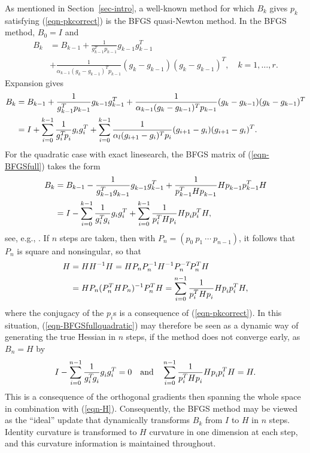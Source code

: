 \documentclass[11pt,twoside]{article}
\begin{document}
As mentioned in Section~\ref{sec-intro}, a well-known method for which
$B_k$ gives $p_k$ satisfying (\ref{eqn-pkcorrect}) is the BFGS
quasi-Newton method. In the BFGS method, $B_0=I$ and
\begin{align}
B_k & = B_{k-1} + \frac1{g_{k-1}^T p_{k-1}}
 g_{k-1}g_{k-1}^T  \nonumber \\
& +
\frac1{\alpha_{k-1}(g_k-g_{k-1})^Tp_{k-1}}(g_{k}-g_{k-1})(g_{k}-g_{k-1})^T,
\quad k=1,\dots,r.
\label{eqn-BFGS}
\end{align}
Expansion gives
\begin{align} \nonumber
B_k & = B_{k-1} + \frac1{g_{k-1}^T p_{k-1}}
 g_{k-1}g_{k-1}^T
 +
\frac1{\alpha_{k-1}(g_k-g_{k-1})^Tp_{k-1}}(g_{k}-g_{k-1})(g_{k}-g_{k-1})^T \\
& = I + \sum_{i=0}^{k-1} \frac1{g_i\T p_i\drop} g_i g_i^T +
\sum_{i=0}^{k-1} \frac1{\alpha_l(g_{i+1}-g_i)^T p_i}
(g_{i+1}-g_{i})(g_{i+1}-g_{i})^T.
\label{eqn-BFGSfull}
\end{align}
For the quadratic case with exact linesearch, the BFGS matrix of
(\ref{eqn-BFGSfull}) takes the form
\begin{align}\nonumber
B_k & = B_{k-1} - \frac1{g_{k-1}^T g_{k-1}\drop} g_{k-1}\drop g_{k-1}^T +
\frac1{p_{k-1}^T H p_{k-1}\drop} H p_{k-1}\drop p_{k-1}^T H \\
& = I - \sum_{i=0}^{k-1} \frac1{g_i\T g_i\drop} g_i g_i^T +
\sum_{i=0}^{k-1} \frac1{p_i^T H p_i\drop} H p_i\drop p_i^T H,
\label{eqn-BFGSfullquadratic}
\end{align}
see, e.g., \cite{EF21}. If $n$ steps are taken, then with $P_n = ( p_0
\ p_1 \ \cdots \ p_{n-1})$, it follows that $P_n$ is square and
nonsingular, so that
\begin{align}
H & = H H\inv H =
H P_n P_n\inv H\inv P_n\Tinv P_n^T H  \nonumber \\
& =
H P_n (P_n^T H P_n)\inv P_n^T H =
\sum_{i=0}^{n-1} \frac1{p_i^T H p_i\drop} H p_i\drop p_i^T H,
\label{eqn-H}
\end{align}
where the conjugacy of the $p_i$s is a consequence of
(\ref{eqn-pkcorrect}). In this situation,
(\ref{eqn-BFGSfullquadratic}) may therefore be seen as a dynamic way
of generating the true Hessian in $n$ steps, if the method does not
converge early, as $B_n=H$ by
\[
I - \sum_{i=0}^{n-1} \frac1{g_i\T g_i\drop} g_i\drop g_i^T = 0 \text{and}
\sum_{i=0}^{n-1} \frac1{p_i^T H p_i\drop} H p_i\drop p_i^T H = H.
\]
This is a consequence of the orthogonal gradients then spanning the
whole space in combination with (\ref{eqn-H}). Consequently, the BFGS
method may be viewed as the ``ideal'' update that dynamically
transforms $B_k$ from $I$ to $H$ in $n$ steps. Identity curvature is
transformed to $H$ curvature in one dimension at each step, and this
curvature information is maintained throughout.
\end{document}
